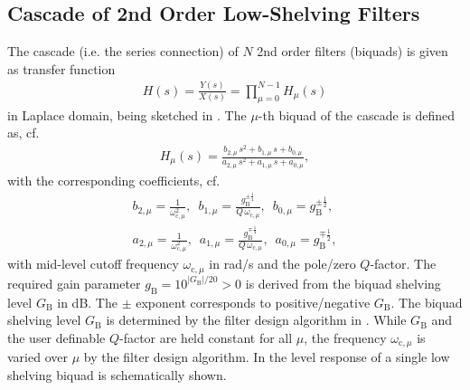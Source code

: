 \subsection{Cascade of 2nd Order Low-Shelving Filters}
%
The cascade (i.e. the series connection) of $N$  2nd order filters (biquads)
is given as transfer function
%
\begin{align}
\label{eq:cascade}
H(s) = \frac{Y(s)}{X(s)} = \prod\limits_{\mu=0}^{N-1} H_\mu(s)
\end{align}
in Laplace domain, being sketched in .
%
The $\mu$-th biquad of the cascade is defined as, cf. 
%
\begin{align}
H_\mu(s) = \frac
{b_{2,\mu}\,s^2 + b_{1,\mu}\,s + b_{0,\mu}}
{a_{2,\mu}\,s^2 + a_{1,\mu}\,s + a_{0,\mu}},
\end{align}
with the corresponding coefficients, cf. 
%
\begin{align}
b_{2,\mu} = \frac{1}{\omega_{\mathrm{c},\mu}^2},\,\,\,
b_{1,\mu} = \frac{g_\mathrm{B}^{\pm\frac{1}{4}}}{Q \, \omega_{\mathrm{c},\mu}},\,\,\,
b_{0,\mu} = g_\mathrm{B}^{\pm\frac{1}{2}},\\\nonumber
a_{2,\mu} = \frac{1}{\omega_{\mathrm{c},\mu}^2},\,\,\,
a_{1,\mu} = \frac{g_\mathrm{B}^{\mp\frac{1}{4}}}{Q \, \omega_{\mathrm{c},\mu}},\,\,\,
a_{0,\mu} = g_\mathrm{B}^{\mp\frac{1}{2}},
\end{align}
%
with mid-level cutoff frequency $\omega_{\mathrm{c},\mu}$ in rad/s and
the pole/zero $Q$-factor.
%
The required gain parameter $g_\mathrm{B} = 10^{|G_\mathrm{B}|/20}>0$
is derived from the biquad shelving level $G_\mathrm{B}$ in dB.
%
The $\pm$ exponent corresponds to positive/negative $G_\mathrm{B}$.
%
The biquad shelving level $G_\mathrm{B}$ is determined by the
filter design algorithm in .
%
While $G_\mathrm{B}$ and the user definable $Q$-factor are held constant for all $\mu$,
the frequency $\omega_{\mathrm{c},\mu}$ is varied over $\mu$ by the filter design
algorithm.
%
In  the level response of a single
low shelving biquad is schematically shown.
%

%

%



